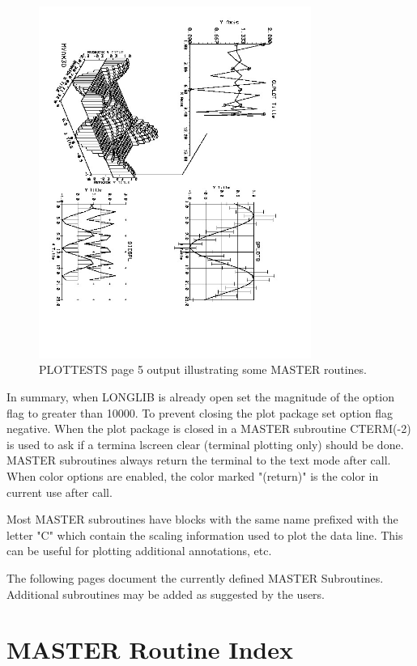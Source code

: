 \documentclass[11pt]{report}
\begin{document}
\begin{figure}[thb]
\centering
\includegraphics[width=3.5in,angle=90,origin=c]{figures/plottests4.jpg}
\vspace{-.5in}
\caption{PLOTTESTS page 5 output illustrating some MASTER routines.
\label{fig:plottests4}} 
\end{figure}

In summary, when LONGLIB is already open set the magnitude of the
option flag to greater than 10000.  To prevent closing the plot
package set option flag negative.  When the plot package is closed in
a MASTER subroutine CTERM(-2) is used to ask if a termina lscreen
clear (terminal plotting only) should be done.  MASTER subroutines
always return the terminal to the text mode after call.  When color
options are enabled, the color marked "(return)" is the color in
current use after call.

Most MASTER subroutines have  blocks with the same name
prefixed with the letter "C" which contain the scaling information
used to plot the data line. This can be useful for plotting additional
annotations, etc.

The following pages document the currently defined MASTER Subroutines. 
Additional subroutines may be added as suggested by the users.

\section{MASTER Routine Index}
\end{document}
